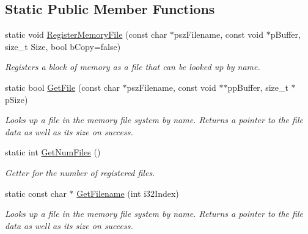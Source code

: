 \subsection*{Static Public Member Functions}
\begin{DoxyCompactItemize}
\item 
static void \hyperlink{class_c_p_v_r_t_memory_file_system_aadd3d773b85441690dff99b9546cd783}{Register\+Memory\+File} (const char $\ast$psz\+Filename, const void $\ast$p\+Buffer, size\+\_\+t Size, bool b\+Copy=false)
\begin{DoxyCompactList}\small\item\em Registers a block of memory as a file that can be looked up by name. \end{DoxyCompactList}\item 
static bool \hyperlink{class_c_p_v_r_t_memory_file_system_afa181aafa268d81f0bff5f902ccbb180}{Get\+File} (const char $\ast$psz\+Filename, const void $\ast$$\ast$pp\+Buffer, size\+\_\+t $\ast$p\+Size)
\begin{DoxyCompactList}\small\item\em Looks up a file in the memory file system by name. Returns a pointer to the file data as well as its size on success. \end{DoxyCompactList}\item 
static int \hyperlink{class_c_p_v_r_t_memory_file_system_a959b05ef8c43478d8c3a8e8c921fa31c}{Get\+Num\+Files} ()
\begin{DoxyCompactList}\small\item\em Getter for the number of registered files. \end{DoxyCompactList}\item 
static const char $\ast$ \hyperlink{class_c_p_v_r_t_memory_file_system_a638b43163ac8e0b70944050755f2c7c1}{Get\+Filename} (int i32\+Index)
\begin{DoxyCompactList}\small\item\em Looks up a file in the memory file system by name. Returns a pointer to the file data as well as its size on success. \end{DoxyCompactList}\end{DoxyCompactItemize}
